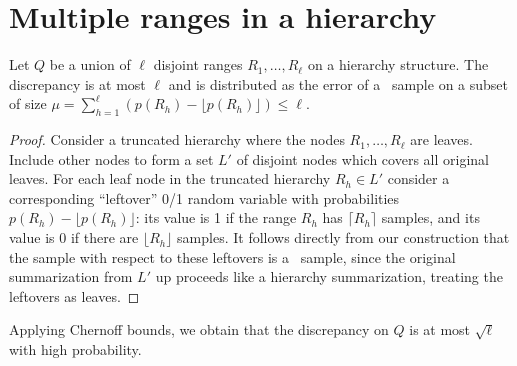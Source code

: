 \documentclass[11pt]{article}
\begin{document}
\section{Multiple ranges in a hierarchy} 
\label{mrangeH:sec}

 \begin{lemma} \label{hierarcyunionbound:lemma}
Let $Q$ be a union of $\ell$ disjoint ranges $R_1,\ldots,R_\ell$ on a
hierarchy structure. 
The discrepancy is at most $\ell$ and is distributed
as the error of a \varopt\ sample on a subset of size
$\mu=\sum_{h=1}^\ell (p(R_h)-\lfloor p(R_h)\rfloor)\leq \ell$.
\end{lemma}

\begin{proof}
Consider a truncated hierarchy where 
the nodes $R_1,\ldots,R_\ell$ are leaves.  Include other nodes to form
a set $L'$ of disjoint nodes which covers all original leaves.  For
each leaf node in the truncated hierarchy $R_h\in L'$ consider a
corresponding ``leftover'' 0/1 random variable with 
probabilities $p(R_h)-\lfloor p(R_h)\rfloor$: 
its value is 1 if the range $R_h$ has $\lceil R_h \rceil$ samples, 
and its value is $0$ if there are
$\lfloor R_h \rfloor$ samples. 
It follows directly from our construction that 
the sample with respect to these leftovers is a \varopt\ sample, since
the original summarization from $L'$ up proceeds like a hierarchy
summarization, treating the leftovers as leaves. 
\end{proof}

Applying Chernoff bounds, we obtain that 
the discrepancy on $Q$ is at most $\sqrt{\ell}$ with high probability.
\end{document}
